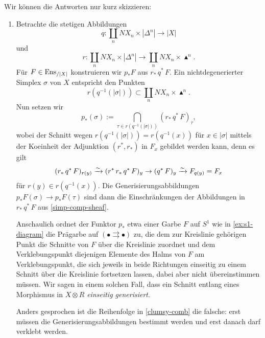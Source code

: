Wir können die Antworten nur kurz skizzieren:
\begin{enumerate}
\item Betrachte die stetigen Abbildungen
  \[ q: \coprod_n NX_n \times |\Delta^n| \to |X| \]
  und
  \[ r: \coprod_n NX_n \times |\Delta^n| \to
  \coprod_n NX_n \times \blacktriangle^n.
  \]
  Für $F \in \operatorname{Ens}_{/|X|}$ konstruieren wir $p_*F$ aus $r_* \,q^*\,
  F$. Ein nichtdegenerierter Simplex $\sigma$ von $X$ entspricht den
  Punkten
  \[ r(q^{-1}(|\sigma|)) \subset \coprod_n NX_n \times \blacktriangle^n.
  \]
  Nun setzen wir
  \[ p_*(\sigma) := \bigcap_{\tau \in r(q^{-1}(|\sigma|))} (r_*\,q^*\,F)_\tau , \]
  wobei der Schnitt wegen $r(q^{-1}(|\sigma|)) = r(q^{-1}(x))$ für $x
  \in |\sigma|$ mittels der Koeinheit der Adjunktion $(r^*, r_*)$ in
  $F_x$ gebildet werden kann, denn es gilt
  \[ (r_*\,q^*\,F)_{r(y)} \xrightarrow[]{\sim} (r^*\,r_*\,q^*\,F)_y
  \to (q^*\, F)_y \xrightarrow[]{\sim} F_{q(y)} = F_x
  \]
  für $r(y) \in r(q^{-1}(x))$. Die Generisierungsabbildungen
  $p_*F(\sigma) \to p_*F(\tau)$ sind dann die Einschränkungen der
  Abbildungen in $r_* \,q^*\, F$ aus \ref{simp-comp-sheaf}.

  Anschaulich ordnet der Funktor $p_*$ etwa einer Garbe $F$ auf $S^1$
  wie in \ref{ex:s1-diagram} die Prägarbe auf $(\bullet
  \rightrightarrows \bullet)$ zu, die dem zur Kreislinie gehörigen
  Punkt die Schnitte von $F$ über die Kreislinie zuordnet und dem
  Verklebungspunkt diejenigen Elemente des Halms von $F$ am
  Verklebungspunkt, die sich jeweils in beide Richtungen einseitig zu
  einem Schnitt über die Kreislinie fortsetzen lassen, dabei aber
  nicht übereinstimmen müssen. Wir sagen in einem solchen Fall, dass
  ein Schnitt entlang eines Morphismus in $X \otimes R$
  \emph{einseitig generisiert}.

  Anders gesprochen ist die Reihenfolge in \ref{clumsy-comb} die
  falsche: erst müssen die Generisierungsabbildungen bestimmt werden
  und erst danach darf verklebt werden.


\end{enumerate}
